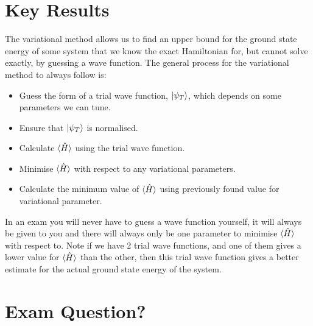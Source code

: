 \section{Key Results}

The variational method allows us to find an upper bound for the ground state energy of some system that we know the exact Hamiltonian for, but cannot solve exactly, by guessing a wave function. The general process for the variational method to always follow is:

\begin{itemize}
    \item Guess the form of a trial wave function, $\ket{\psi_T}$, which depends on some parameters we can tune.
    \item Ensure that $\ket{\psi_T}$ is normalised.
    \item Calculate $\braket{\Hat{H}}$ using the trial wave function.
    \item Minimise $\braket{\Hat{H}}$ with respect to any variational parameters.
    \item Calculate the minimum value of $\braket{\Hat{H}}$ using previously found value for variational parameter.
\end{itemize}

\noindent In an exam you will never have to guess a wave function yourself, it will always be given to you and there will always only be one parameter to minimise $\braket{\Hat{H}}$ with respect to. Note if we have 2 trial wave functions, and one of them gives a lower value for $\braket{\Hat{H}}$ than the other, then this trial wave function gives a better estimate for the actual ground state energy of the system.

\section{Exam Question?}
